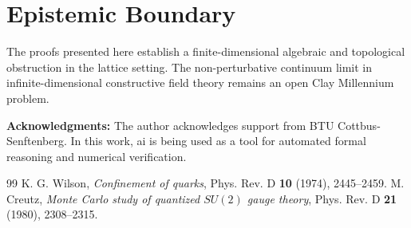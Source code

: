 \documentclass[11pt,a4paper]{article}
\theoremstyle{definition}
\begin{document}
\section{Epistemic Boundary}

The proofs presented here establish a finite-dimensional algebraic and topological obstruction in the lattice setting. The non-perturbative continuum limit in infinite-dimensional constructive field theory remains an open Clay Millennium problem.

\vspace{1em}
\noindent\textbf{Acknowledgments:} The author acknowledges support from BTU Cottbus-Senftenberg. In this work, ai is being used as a tool for automated formal reasoning and numerical verification.

\begin{thebibliography}{99}
 K. G. Wilson, \emph{Confinement of quarks}, Phys. Rev. D \textbf{10} (1974), 2445--2459.
 M. Creutz, \emph{Monte Carlo study of quantized $SU(2)$ gauge theory}, Phys. Rev. D \textbf{21} (1980), 2308--2315.
\end{thebibliography}
\end{document}
